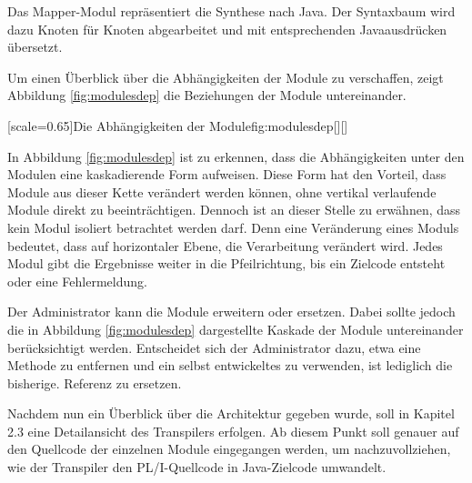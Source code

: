 Das Mapper-Modul repräsentiert die Synthese nach Java. Der Syntaxbaum wird dazu Knoten für Knoten abgearbeitet und mit entsprechenden Javaausdrücken übersetzt.

Um einen Überblick über die Abhängigkeiten der Module zu verschaffen, zeigt
Abbildung \ref{fig:modulesdep} die Beziehungen der Module untereinander.

[scale=0.65]{Die Abhängigkeiten der Module}{fig:modulesdep}[][]
\pagebreak

In Abbildung \ref{fig:modulesdep} ist zu erkennen, dass die Abhängigkeiten unter den Modulen eine kaskadierende Form aufweisen. Diese Form hat den Vorteil, dass Module aus dieser Kette verändert werden können, ohne vertikal verlaufende Module direkt zu beeinträchtigen. Dennoch ist an dieser Stelle zu erwähnen, dass kein Modul isoliert betrachtet werden darf. Denn eine Veränderung eines Moduls bedeutet, dass auf horizontaler Ebene, die Verarbeitung verändert wird. Jedes Modul gibt die Ergebnisse weiter in die Pfeilrichtung, bis ein Zielcode entsteht oder eine Fehlermeldung.

Der Administrator kann die Module erweitern oder ersetzen. Dabei sollte jedoch die in Abbildung \ref{fig:modulesdep} dargestellte Kaskade der Module untereinander berücksichtigt werden. Entscheidet sich der Administrator dazu, etwa eine Methode zu entfernen und ein selbst entwickeltes zu verwenden, ist lediglich die bisherige. 
Referenz zu ersetzen.

Nachdem nun ein Überblick über die Architektur gegeben wurde, soll in Kapitel 2.3 eine Detailansicht des Transpilers erfolgen. Ab diesem Punkt soll genauer auf den Quellcode der einzelnen Module eingegangen werden, um nachzuvollziehen, wie der Transpiler den PL/I-Quellcode in Java-Zielcode umwandelt.


